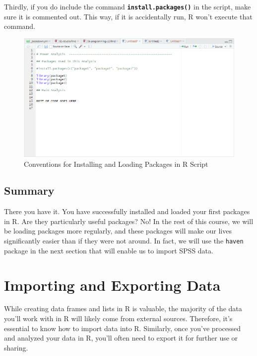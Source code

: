 \documentclass[
]{book}
\begin{document}
Thirdly, if you do include the command \textbf{\texttt{install.packages()}} in the script, make sure it is commented out. This way, if it is accidentally run, R won't execute that command.

\begin{figure}
\centering
\includegraphics{img/04-packages-convention.png}
\caption{\label{fig:unnamed-chunk-159}Conventions for Installing and Loading Packages in R Script}
\end{figure}

\hypertarget{summary-3}{%
\subsection{Summary}\label{summary-3}}

There you have it. You have successfully installed and loaded your first packages in R. Are they particularly useful packages? No! In the rest of this course, we will be loading packages more regularly, and these packages will make our lives significantly easier than if they were not around. In fact, we will use the \texttt{haven} package in the next section that will enable us to import SPSS data.

\hypertarget{importing}{%
\section{Importing and Exporting Data}\label{importing}}

While creating data frames and lists in R is valuable, the majority of the data you'll work with in R will likely come from external sources. Therefore, it's essential to know how to import data into R. Similarly, once you've processed and analyzed your data in R, you'll often need to export it for further use or sharing.
\end{document}
